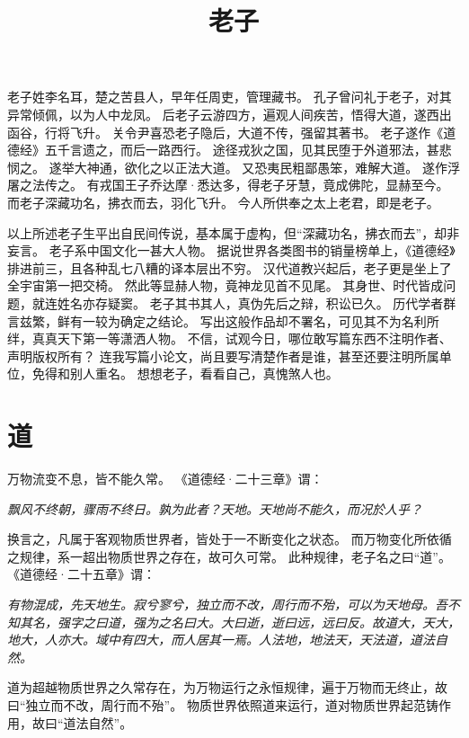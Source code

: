 \documentclass[11pt]{article}
\title{老子}
\date{}
\begin{document}
  \maketitle
  
  \linenumbers

老子姓李名耳，楚之苦县人，早年任周吏，管理藏书。
孔子曾问礼于老子，对其异常倾佩，以为人中龙凤。
后老子云游四方，遍观人间疾苦，悟得大道，遂西出函谷，行将飞升。
关令尹喜恐老子隐后，大道不传，强留其著书。
老子遂作《道德经》五千言遗之，而后一路西行。
途径戎狄之国，见其民堕于外道邪法，甚悲悯之。
遂举大神通，欲化之以正法大道。
又恐夷民粗鄙愚笨，难解大道。
遂作浮屠之法传之。
有戎国王子乔达摩·悉达多，得老子牙慧，竟成佛陀，显赫至今。
而老子深藏功名，拂衣而去，羽化飞升。
今人所供奉之太上老君，即是老子。

\par

以上所述老子生平出自民间传说，基本属于虚构，但“深藏功名，拂衣而去”，却非妄言。
老子系中国文化一甚大人物。
据说世界各类图书的销量榜单上，《道德经》排进前三，且各种乱七八糟的译本层出不穷。
汉代道教兴起后，老子更是坐上了全宇宙第一把交椅。
然此等显赫人物，竟神龙见首不见尾。
其身世、时代皆成问题，就连姓名亦存疑窦。
老子其书其人，真伪先后之辩，积讼已久。
历代学者群言兹繁，鲜有一较为确定之结论。
写出这般作品却不署名，可见其不为名利所绊，真真天下第一等潇洒人物。
不信，试观今日，哪位敢写篇东西不注明作者、声明版权所有？
连我写篇小论文，尚且要写清楚作者是谁，甚至还要注明所属单位，免得和别人重名。
想想老子，看看自己，真愧煞人也。

\section{道}
万物流变不息，皆不能久常。
《道德经·二十三章》谓：

\textit{飘风不终朝，骤雨不终日。孰为此者？天地。天地尚不能久，而况於人乎？}

换言之，凡属于客观物质世界者，皆处于一不断变化之状态。
而万物变化所依循之规律，系一超出物质世界之存在，故可久可常。
此种规律，老子名之曰“道”。
《道德经·二十五章》谓：

\textit{有物混成，先天地生。寂兮寥兮，独立而不改，周行而不殆，可以为天地母。吾不知其名，强字之曰道，强为之名曰大。大曰逝，逝曰远，远曰反。故道大，天大，地大，人亦大。域中有四大，而人居其一焉。人法地，地法天，天法道，道法自然。}

道为超越物质世界之久常存在，为万物运行之永恒规律，遍于万物而无终止，故曰“独立而不改，周行而不殆”。
物质世界依照道来运行，道对物质世界起范铸作用，故曰“道法自然”。
\end{document}
